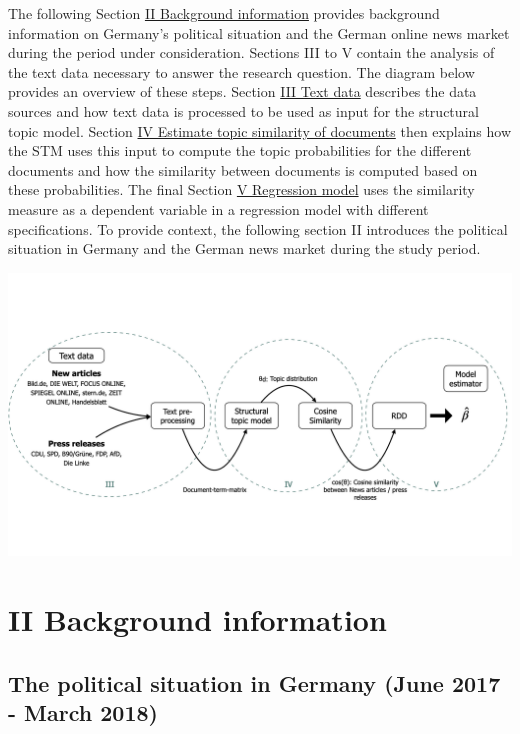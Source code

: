 \documentclass[
]{article}
\begin{document}
The following Section \protect\hyperlink{ii-background-information}{II
Background information} provides background information on Germany's
political situation and the German online news market during the period
under consideration. Sections III to V contain the analysis of the text
data necessary to answer the research question. The diagram below
provides an overview of these steps. Section
\protect\hyperlink{iii-text-data}{III Text data} describes the data
sources and how text data is processed to be used as input for the
structural topic model. Section
\protect\hyperlink{iv-estimate-topic-similarity-of-documents}{IV
Estimate topic similarity of documents} then explains how the STM uses
this input to compute the topic probabilities for the different
documents and how the similarity between documents is computed based on
these probabilities. The final Section
\protect\hyperlink{v-regression-model}{V Regression model} uses the
similarity measure as a dependent variable in a regression model with
different specifications. To provide context, the following section II
introduces the political situation in Germany and the German news market
during the study period.

\includegraphics{../figs/high_level_overview.png}

\hypertarget{ii-background-information}{%
\section{II Background information}\label{ii-background-information}}

\hypertarget{the-political-situation-in-germany-june-2017---march-2018}{%
\subsection{The political situation in Germany (June 2017 - March
2018)}\label{the-political-situation-in-germany-june-2017---march-2018}}
\end{document}
